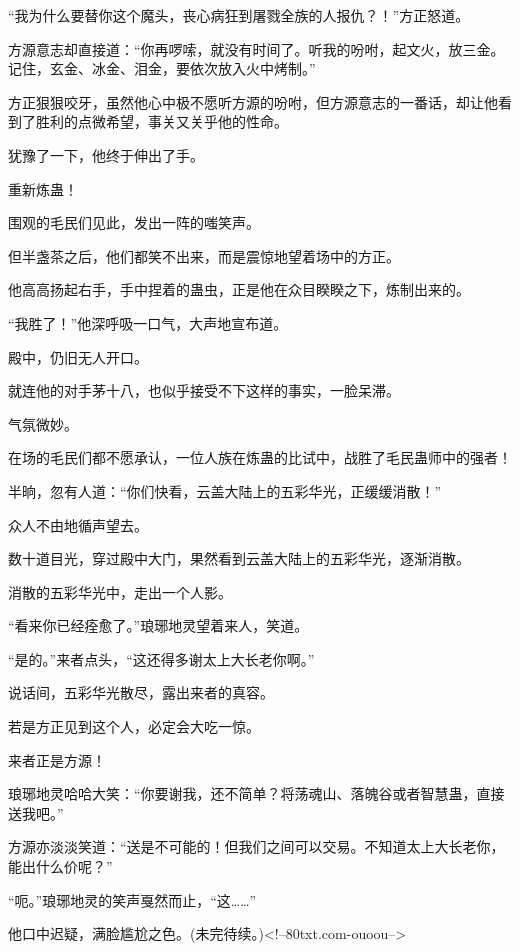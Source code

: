 \begin{this_body}
“我为什么要替你这个魔头，丧心病狂到屠戮全族的人报仇？！”方正怒道。

方源意志却直接道：“你再啰嗦，就没有时间了。听我的吩咐，起文火，放三金。记住，玄金、冰金、泪金，要依次放入火中烤制。”

方正狠狠咬牙，虽然他心中极不愿听方源的吩咐，但方源意志的一番话，却让他看到了胜利的点微希望，事关又关乎他的性命。

犹豫了一下，他终于伸出了手。

重新炼蛊！

围观的毛民们见此，发出一阵的嗤笑声。

但半盏茶之后，他们都笑不出来，而是震惊地望着场中的方正。

他高高扬起右手，手中捏着的蛊虫，正是他在众目睽睽之下，炼制出来的。

“我胜了！”他深呼吸一口气，大声地宣布道。

殿中，仍旧无人开口。

就连他的对手茅十八，也似乎接受不下这样的事实，一脸呆滞。

气氛微妙。

在场的毛民们都不愿承认，一位人族在炼蛊的比试中，战胜了毛民蛊师中的强者！

半晌，忽有人道：“你们快看，云盖大陆上的五彩华光，正缓缓消散！”

众人不由地循声望去。

数十道目光，穿过殿中大门，果然看到云盖大陆上的五彩华光，逐渐消散。

消散的五彩华光中，走出一个人影。

“看来你已经痊愈了。”琅琊地灵望着来人，笑道。

“是的。”来者点头，“这还得多谢太上大长老你啊。”

说话间，五彩华光散尽，露出来者的真容。

若是方正见到这个人，必定会大吃一惊。

来者正是方源！

琅琊地灵哈哈大笑：“你要谢我，还不简单？将荡魂山、落魄谷或者智慧蛊，直接送我吧。”

方源亦淡淡笑道：“送是不可能的！但我们之间可以交易。不知道太上大长老你，能出什么价呢？”

“呃。”琅琊地灵的笑声戛然而止，“这……”

他口中迟疑，满脸尴尬之色。(未完待续。)<!--80txt.com-ouoou-->

\end{this_body}

